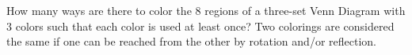 How many ways are there to color the $8$ regions of a three-set Venn Diagram with $3$ colors such that each color is used at least once? Two colorings are considered the same if one can be reached from the other by rotation and/or reflection.
